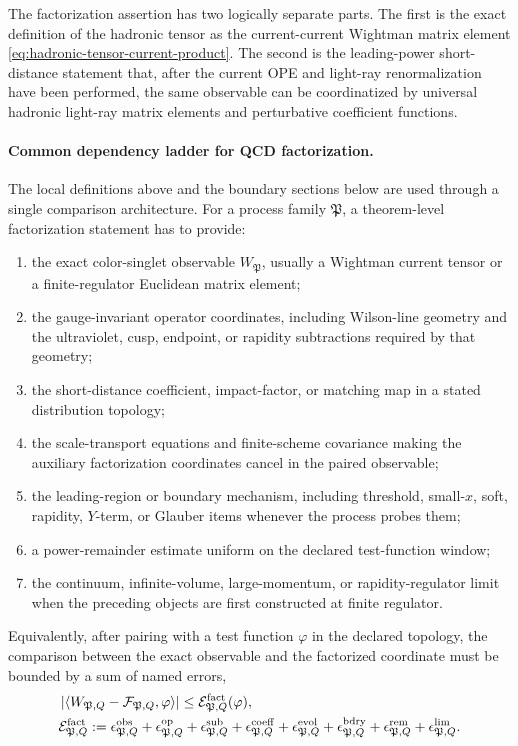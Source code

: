 The factorization assertion has two logically separate parts.  The first is
the exact definition of the hadronic tensor as the current-current Wightman
matrix element \eqref{eq:hadronic-tensor-current-product}.  The second is the
leading-power short-distance statement that, after the current OPE and
light-ray renormalization have been performed, the same observable can be
coordinatized by universal hadronic light-ray matrix elements and perturbative
coefficient functions.

\paragraph{Common dependency ladder for QCD factorization.}
The local definitions above and the boundary sections below are used through a
single comparison architecture.  For a process family \(\mathfrak P\), a
theorem-level factorization statement has to provide:
\begin{enumerate}
  \item the exact color-singlet observable \(W_{\mathfrak P}\), usually a
  Wightman current tensor or a finite-regulator Euclidean matrix element;
  \item the gauge-invariant operator coordinates, including Wilson-line
  geometry and the ultraviolet, cusp, endpoint, or rapidity subtractions
  required by that geometry;
  \item the short-distance coefficient, impact-factor, or matching map in a
  stated distribution topology;
  \item the scale-transport equations and finite-scheme covariance making the
  auxiliary factorization coordinates cancel in the paired observable;
  \item the leading-region or boundary mechanism, including threshold,
  small-\(x\), soft, rapidity, \(Y\)-term, or Glauber items whenever the
  process probes them;
  \item a power-remainder estimate uniform on the declared test-function
  window;
  \item the continuum, infinite-volume, large-momentum, or rapidity-regulator
  limit when the preceding objects are first constructed at finite regulator.
\end{enumerate}
Equivalently, after pairing with a test function \(\varphi\) in the declared
topology, the comparison between the exact observable and the factorized
coordinate must be bounded by a sum of named errors,
\begin{equation}
\begin{aligned}
&
\left|
  \left\langle
    W_{\mathfrak P,Q}-\mathcal F_{\mathfrak P,Q},
    \varphi
  \right\rangle
\right|
\le
\mathcal E_{\mathfrak P,Q}^{\rm fact}(\varphi),
\\
&
\mathcal E_{\mathfrak P,Q}^{\rm fact}
:=
\epsilon_{\mathfrak P,Q}^{\rm obs}
+\epsilon_{\mathfrak P,Q}^{\rm op}
+\epsilon_{\mathfrak P,Q}^{\rm sub}
+\epsilon_{\mathfrak P,Q}^{\rm coeff}
+\epsilon_{\mathfrak P,Q}^{\rm evol}
+\epsilon_{\mathfrak P,Q}^{\rm bdry}
+\epsilon_{\mathfrak P,Q}^{\rm rem}
+\epsilon_{\mathfrak P,Q}^{\rm lim}.
\end{aligned}
\label{eq:qcd-common-factorization-budget}
\end{equation}
